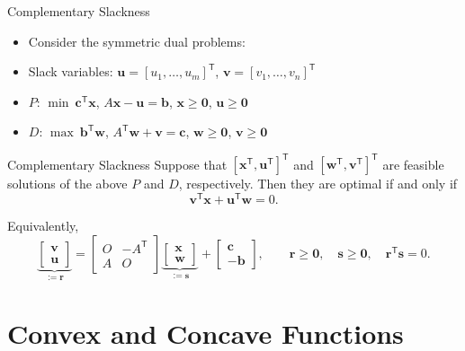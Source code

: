 \documentclass[aspectratio=169,hyperref,UTF8,CJK]{beamer}
\newcommand{\trans}{\mathsf{T}}
\newcommand{\vect}[1]{\boldsymbol{#1}}
\begin{document}
\begin{frame}{Complementary Slackness}
  \scriptsize
  \begin{itemize}
    \item Consider the symmetric dual problems:
    \item Slack variables: $\vect{u}=[u_1,\ldots,u_m]^{\trans}$, $\vect{v}=[v_1,\ldots,v_n]^{\trans}$
    \item $P$: $\min\ \vect{c}^{\trans}\vect{x}$, $A\vect{x}-\vect{u}=\vect{b}$, $\vect{x}\ge\vect{0}$, $\vect{u}\ge\vect{0}$
    \item $D$: $\max\ \vect{b}^{\trans}\vect{w}$, $A^{\trans}\vect{w}+\vect{v}=\vect{c}$, $\vect{w}\ge\vect{0}$, $\vect{v}\ge\vect{0}$
  \end{itemize}
  \begin{block}{Complementary Slackness}
    Suppose that $[\vect{x}^{\trans},\vect{u}^{\trans}]^{\trans}$ and
    $[\vect{w}^{\trans},\vect{v}^{\trans}]^{\trans}$ are feasible solutions of
    the above $P$ and $D$, respectively. Then they are optimal if and only if
    \begin{equation*}
      \vect{v}^{\trans}\vect{x}+\vect{u}^{\trans}\vect{w}=0.
    \end{equation*}
  \end{block}
  Equivalently,
  \begin{equation*}
    \underbrace{\begin{bmatrix}\vect{v}\\\vect{u}\end{bmatrix}}_{:=\vect{r}}
    =
    \begin{bmatrix}O&-A^{\trans}\\A&O\end{bmatrix}
    \underbrace{\begin{bmatrix}\vect{x}\\\vect{w}\end{bmatrix}}_{:=\vect{s}}
    +\begin{bmatrix}\vect{c}\\-\vect{b}\end{bmatrix},
    \qquad \vect{r}\ge\vect{0},\quad\vect{s}\ge\vect{0},\quad
    \vect{r}^{\trans}\vect{s}=0.
  \end{equation*}
\end{frame}

\section{Convex and Concave Functions}
\end{document}
